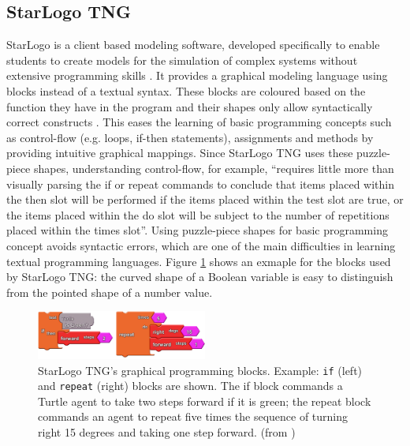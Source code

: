 \documentclass[runningheads,a4paper]{llncs}
\begin{document}
 \subsection{StarLogo TNG}
  StarLogo is a client based modeling software, developed specifically to enable students to 
  create models for the simulation of complex systems without extensive programming skills \cite{klopfer2009starlogo}.
  It provides a graphical modeling language using blocks instead of a textual syntax. 
  These blocks are coloured based on the function they have in the program and their shapes only allow syntactically correct constructs \cite{klopfer2009starlogo}.
  This eases the learning of basic programming concepts such as control-flow (e.g. loops, if-then statements),
  assignments and methods by providing intuitive graphical mappings. Since StarLogo TNG uses these puzzle-piece shapes, understanding 
  control-flow, for example, ``requires little more than visually parsing the if or repeat commands 
  to conclude that items placed within the then slot will be performed if the items placed within the 
  test slot are true, or the items placed within the do slot will be subject to the number of repetitions placed within the times slot''\cite{smith2011biology}.
  Using puzzle-piece shapes for basic programming concept avoids syntactic errors, 
  which are one of the main difficulties in learning textual programming languages.
  Figure \ref{fig1} shows an exmaple for the blocks used by StarLogo TNG: 
  the curved shape of a Boolean variable is easy to distinguish from the pointed shape of a number value.
  
  \begin{figure}[H]
	\centering
  \includegraphics[width=0.5\textwidth]{images/StarLogoTNGBlocksEx.PNG}
	\caption{ StarLogo TNG’s graphical programming blocks. Example: \texttt{if} (left) and \texttt{repeat} (right) blocks are shown. The
	  if block commands a Turtle agent to take two steps forward if it is green; the repeat block commands an agent to
	  repeat five times the sequence of turning right 15 degrees and taking one step forward. (from \cite{smith2011biology})}
	\label{fig1}
  \end{figure}
  
\end{document}
